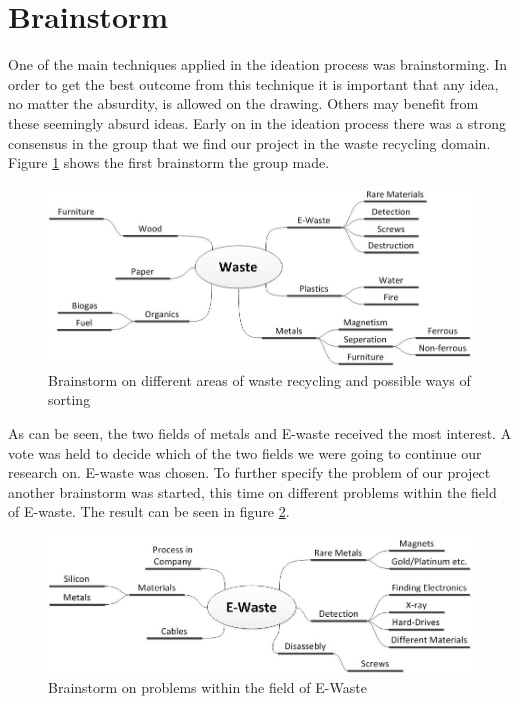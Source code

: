 \documentclass[11pt,a4paper]{article}
\begin{document}
\section{Brainstorm}
One of the main techniques applied in the ideation process was brainstorming. In order to get the best outcome from this technique it is important that any idea, no matter the absurdity, is allowed on the drawing. Others may benefit from these seemingly absurd ideas. Early on in the ideation process there was a strong consensus in the group that we find our project in the waste recycling domain. Figure \ref{fig:wasteTypesBrainstorm} shows the first brainstorm the group made.
\begin{figure}[!h]
	\centering
	\includegraphics[scale=.5]{./graphics/wasteTypesBrainstorm.jpg}
	\caption{Brainstorm on different areas of waste recycling and possible ways of sorting}
	\label{fig:wasteTypesBrainstorm}
\end{figure}
As can be seen, the two fields of metals and E-waste received the most interest. A vote was held to decide which of the two fields we were going to continue our research on. E-waste was chosen. To further specify the problem of our project another brainstorm was started, this time on different problems within the field of E-waste. The result can be seen in figure \ref{fig:EWasteBrainstorm}.
\begin{figure}[!h]
	\centering
	\includegraphics[scale=.5]{./graphics/EWasteBrainstorm.jpg}
	\caption{Brainstorm on problems within the field of E-Waste}
	\label{fig:EWasteBrainstorm}
\end{figure}
\end{document}
